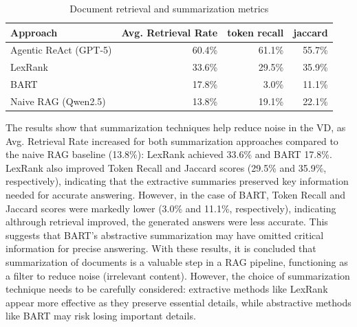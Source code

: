 \begin{table}[t]
\centering
\caption{Document retrieval and summarization metrics}
\label{tab:document_retrieved_metrics_summarization}
\begin{tabular}{lrrr}
\hline
Approach & Avg. Retrieval Rate & token recall & jaccard \\
\hline
Agentic ReAct (\gls{GPT}-5)& 60.4\% & 61.1\%  & 55.7\%\\
LexRank & 33.6\% & 29.5\%  & 35.9\% \\
BART & 17.8\% & 3.0\% & 11.1\% \\
Naive \gls{RAG} (Qwen2.5) & 13.8\% & 19.1\% & 22.1\% \\
\hline
\end{tabular}
\end{table}

The results show that summarization techniques help reduce noise in the \gls{VD}, as Avg. Retrieval Rate increased for both summarization approaches compared to the naive RAG baseline (13.8\%): LexRank achieved 33.6\% and BART 17.8\%.
LexRank also improved Token Recall and Jaccard scores (29.5\% and 35.9\%, respectively), indicating that the extractive summaries preserved key information needed for accurate answering.
However, in the case of BART, Token Recall and Jaccard scores were markedly lower (3.0\% and 11.1\%, respectively), indicating althrough retrieval improved, the generated answers were less accurate. This suggests that BART's abstractive summarization may have omitted critical information for precise answering.
With these results, it is concluded that summarization of documents is a valuable step in a \gls{RAG} pipeline, functioning as a filter to reduce noise (irrelevant content).
However, the choice of summarization technique needs to be carefully considered: extractive methods like LexRank appear more effective as they preserve essential details, while abstractive methods like BART may risk losing important details.

 

